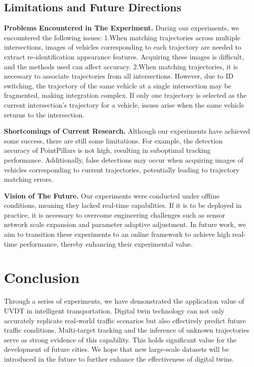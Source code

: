 \documentclass[lettersize,journal]{IEEEtran}
\begin{document}
\subsection{Limitations and Future Directions}

\textbf{Problems Encountered in The Experiment.}
During our experiments, we encountered the following issues:  
1.When matching trajectories across multiple intersections, images of vehicles corresponding to each trajectory are needed to extract re-identification appearance features. 
Acquiring these images is difficult, and the methods used can affect accuracy.  
2.When matching trajectories, it is necessary to associate trajectories from all intersections. 
However, due to ID switching, the trajectory of the same vehicle at a single intersection may be fragmented, making integration complex. 
If only one trajectory is selected as the current intersection's trajectory for a vehicle, issues arise when the same vehicle returns to the intersection.

\textbf{Shortcomings of Current Research.}
Although our experiments have achieved some success, there are still some limitations. 
For example, the detection accuracy of PointPillars is not high, resulting in suboptimal tracking performance. 
Additionally, false detections may occur when acquiring images of vehicles corresponding to current trajectories, potentially leading to trajectory matching errors.

\textbf{Vision of The Future.}
Our experiments were conducted under offline conditions, meaning they lacked real-time capabilities. 
If it is to be deployed in practice, it is necessary to overcome engineering challenges such as sensor network scale expansion and parameter adaptive adjustment.
In future work, we aim to transition these experiments to an online framework to achieve high real-time performance, thereby enhancing their experimental value.


\section{Conclusion}

Through a series of experiments, we have demonstrated the application value of UVDT in intelligent transportation. 
Digital twin technology can not only accurately replicate real-world traffic scenarios but also effectively predict future traffic conditions. 
Multi-target tracking and the inference of unknown trajectories serve as strong evidence of this capability. 
This holds significant value for the development of future cities.
We hope that new large-scale datasets will be introduced in the future to further enhance the effectiveness of digital twins.
\end{document}
